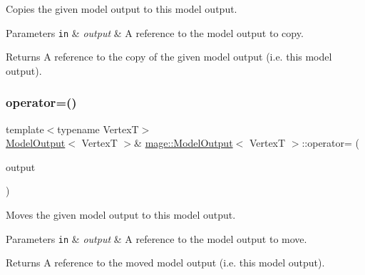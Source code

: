 Copies the given model output to this model output.


\begin{DoxyParams}[1]{Parameters}
\mbox{\tt in}  & {\em output} & A reference to the model output to copy. \\
\hline
\end{DoxyParams}
\begin{DoxyReturn}{Returns}
A reference to the copy of the given model output (i.\+e. this model output). 
\end{DoxyReturn}
\hypertarget{structmage_1_1_model_output_a5e368e3ae8a52d329f8d9b5f1c4b9d03}{}\label{structmage_1_1_model_output_a5e368e3ae8a52d329f8d9b5f1c4b9d03} 
\subsubsection{\texorpdfstring{operator=()}{operator=()}\hspace{0.1cm}{\footnotesize\ttfamily [2/2]}}
{\footnotesize\ttfamily template$<$typename VertexT$>$ \\
\hyperlink{structmage_1_1_model_output}{Model\+Output}$<$ VertexT $>$\& \hyperlink{structmage_1_1_model_output}{mage\+::\+Model\+Output}$<$ VertexT $>$\+::operator= (\begin{DoxyParamCaption}\item[{\hyperlink{structmage_1_1_model_output}{Model\+Output}$<$ VertexT $>$ \&\&}]{output }\end{DoxyParamCaption})\hspace{0.3cm}{\ttfamily [delete]}}

Moves the given model output to this model output.


\begin{DoxyParams}[1]{Parameters}
\mbox{\tt in}  & {\em output} & A reference to the model output to move. \\
\hline
\end{DoxyParams}
\begin{DoxyReturn}{Returns}
A reference to the moved model output (i.\+e. this model output). 
\end{DoxyReturn}
\hypertarget{structmage_1_1_model_output_abd614f9f2e9f9dbc0b2c354ee37f2998}{}\label{structmage_1_1_model_output_abd614f9f2e9f9dbc0b2c354ee37f2998} 
